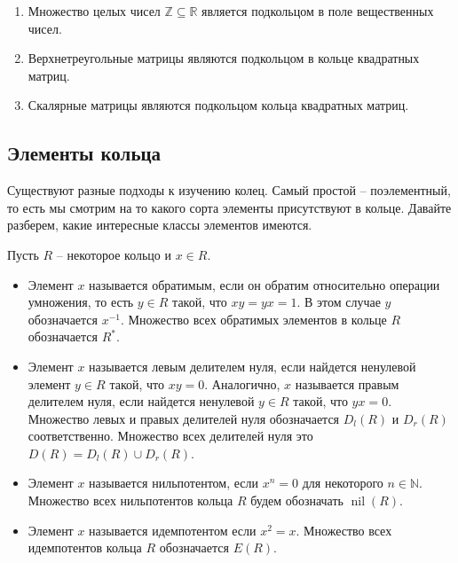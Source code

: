 \begin{examples}
\begin{enumerate}
\item Множество целых чисел $\mathbb Z\subseteq \mathbb R$ является подкольцом в поле вещественных чисел.

\item Верхнетреугольные матрицы являются подкольцом в кольце квадратных матриц.

\item Скалярные матрицы являются подкольцом кольца квадратных матриц.
\end{enumerate}
\end{examples}

\subsection{Элементы кольца}

Существуют разные подходы к изучению колец.
Самый простой -- поэлементный, то есть мы смотрим на то какого сорта элементы присутствуют в кольце.
Давайте разберем, какие интересные классы элементов имеются.

\begin{definition}
Пусть $R$ -- некоторое кольцо и $x\in R$.
\begin{itemize}
\item Элемент $x$ называется обратимым, если он обратим относительно операции умножения, то есть  $y\in R$ такой, что $xy = yx = 1$.
В этом случае $y$ обозначается $x^{-1}$.
Множество всех обратимых элементов в кольце $R$ обозначается $R^*$.

\item Элемент $x$ называется левым делителем нуля, если найдется ненулевой элемент $y\in R$ такой, что $xy = 0$.
Аналогично, $x$ называется правым делителем нуля, если найдется ненулевой $y\in R$ такой, что $yx = 0$.
Множество левых и правых делителей нуля обозначается  $D_l(R)$ и $D_r(R)$ соответственно.
Множество всех делителей нуля это $D(R) = D_l(R) \cup D_r(R)$.

\item Элемент $x$ называется нильпотентом, если $x^n = 0$ для некоторого $n\in \mathbb N$.
Множество всех нильпотентов кольца $R$ будем обозначать $\operatorname{nil}(R)$.

\item Элемент $x$ называется идемпотентом если $x^2 = x$.
Множество всех идемпотентов кольца $R$ обозначается $E(R)$.
\end{itemize}
\end{definition}

